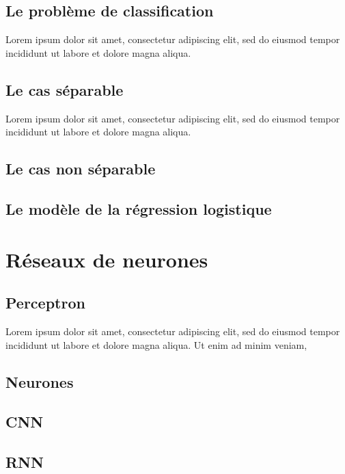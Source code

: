 	\subsection{Le problème de classification}
		Lorem ipsum dolor sit amet, consectetur adipiscing elit, sed do eiusmod tempor incididunt ut labore et dolore magna aliqua.
	\subsection{Le cas séparable }
		Lorem ipsum dolor sit amet, consectetur adipiscing elit, sed do eiusmod tempor incididunt ut labore et dolore magna aliqua.
	\subsection{Le cas non séparable }
		\lipsum[3]
	\subsection{Le modèle de la régression logistique }
		\lipsum[1]
		
	
	
	\section{Réseaux de neurones}
	\subsection{Perceptron}
	Lorem ipsum dolor sit amet, consectetur adipiscing elit, sed do eiusmod tempor incididunt ut labore et dolore magna aliqua. Ut enim ad minim veniam,
	\subsection{Neurones}
	\subsection{CNN}
	\subsection{RNN}
		